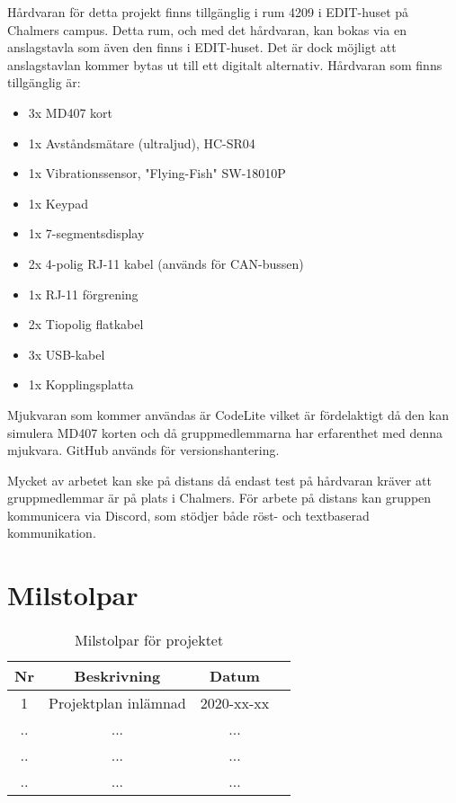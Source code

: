 \documentclass{article}
\begin{document}
Hårdvaran för detta projekt finns tillgänglig i rum 4209 i EDIT-huset på Chalmers campus. Detta rum, och med det hårdvaran, kan bokas via en anslagstavla som även den finns i EDIT-huset. Det är dock möjligt att anslagstavlan kommer bytas ut till ett digitalt alternativ. Hårdvaran som finns tillgänglig är:

\begin{itemize}
    \item 3x MD407 kort
    \item 1x Avståndsmätare (ultraljud), HC-SR04
    \item 1x Vibrationssensor, "Flying-Fish" SW-18010P
    \item 1x Keypad
    \item 1x 7-segmentsdisplay
    \item 2x 4-polig RJ-11 kabel (används för CAN-bussen)
    \item 1x RJ-11 förgrening
    \item 2x Tiopolig flatkabel
    \item 3x USB-kabel
    \item 1x Kopplingsplatta
\end{itemize}

Mjukvaran som kommer användas är CodeLite vilket är fördelaktigt då den kan simulera MD407 korten och då gruppmedlemmarna har erfarenthet med denna mjukvara. GitHub används för versionshantering.

Mycket av arbetet kan ske på distans då endast test på hårdvaran kräver att gruppmedlemmar är på plats i Chalmers. För arbete på distans kan gruppen kommunicera via Discord, som stödjer både röst- och textbaserad kommunikation.

\section{Milstolpar}

\begin{table}[!h]
    \begin{center}
    \begin{tabular}{ |c|c|c|c| }\hline
    Nr & Beskrivning & Datum \\\hline\hline
    1 & Projektplan inlämnad & 2020-xx-xx \\\hline
    .. & ... & ... \\\hline
    .. & ... & ... \\\hline
    .. & ... & ... \\\hline
    \end{tabular}
    \caption{Milstolpar för projektet}
    \label{milstolpar}
    \end{center}
\end{table}
\end{document}
